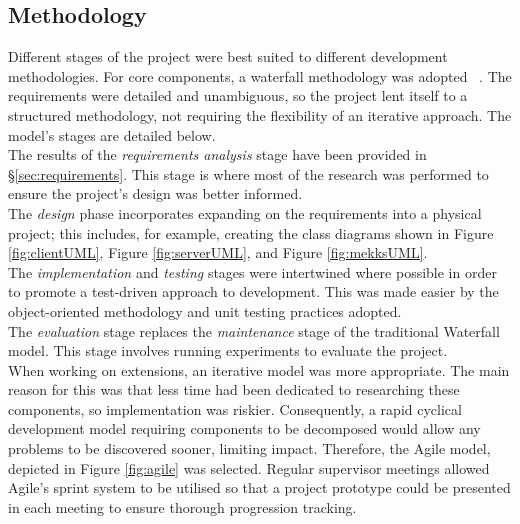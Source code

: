 \subsection{Methodology}
\indent \indent
Different stages of the project were best suited to different development methodologies. For core components, a waterfall methodology was adopted ~\cite{Waterfall}. The requirements were detailed and unambiguous, so the project lent itself to a structured methodology, not requiring the flexibility of an iterative approach. The model's stages are detailed below.
\smallskip \\ \indent
The results of the \textit{requirements analysis} stage have been provided in §\ref{sec:requirements}. This stage is where most of the research was performed to ensure the project's design was better informed.
\smallskip \\ \indent
The \textit{design} phase incorporates expanding on the requirements into a physical project; this includes, for example, creating the class diagrams shown in Figure \ref{fig:clientUML}, Figure \ref{fig:serverUML}, and Figure \ref{fig:mekksUML}.
\smallskip \\ \indent
The \textit{implementation} and \textit{testing} stages were intertwined where possible in order to promote a test-driven approach to development. This was made easier by the object-oriented methodology and unit testing practices adopted.
\smallskip \\ \indent
The \textit{evaluation} stage replaces the \textit{maintenance} stage of the traditional Waterfall model. This stage involves running experiments to evaluate the project. 
\smallskip \\ \indent
When working on extensions, an iterative model was more appropriate. The main reason for this was that less time had been dedicated to researching these components, so implementation was riskier. Consequently, a rapid cyclical development model requiring components to be decomposed would allow any problems to be discovered sooner, limiting impact. Therefore, the Agile model, depicted in Figure \ref{fig:agile} was selected. Regular supervisor meetings allowed Agile's sprint system to be utilised so that a project prototype could be presented in each meeting to ensure thorough progression tracking.
